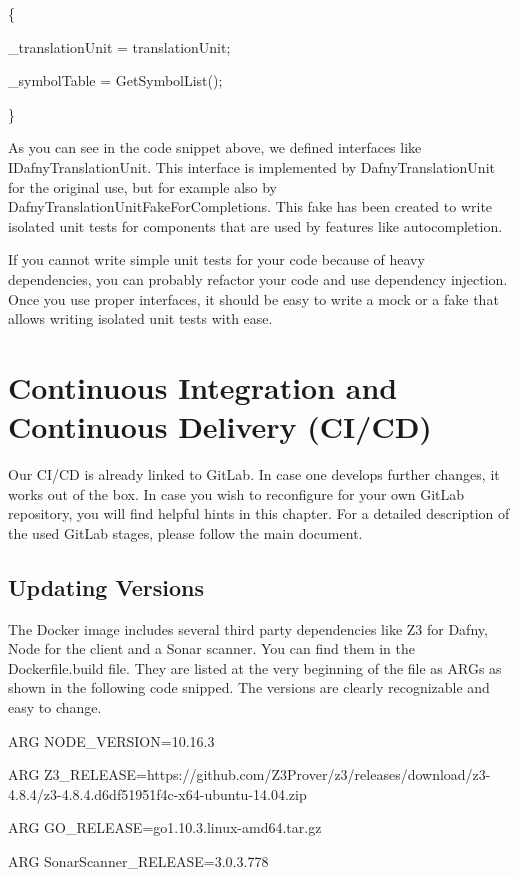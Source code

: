 \documentclass[]{book}
\begin{document}
\{

\_translationUnit = translationUnit;

\_symbolTable = GetSymbolList();

\}

As you can see in the code snippet above, we defined interfaces like IDafnyTranslationUnit. This interface is implemented by DafnyTranslationUnit for the original use, but for example also by DafnyTranslationUnitFakeForCompletions. This fake has been created to write isolated unit tests for components that are used by features like autocompletion.

If you cannot write simple unit tests for your code because of heavy dependencies, you can probably refactor your code and use dependency injection. Once you use proper interfaces, it should be easy to write a mock or a fake that allows writing isolated unit tests with ease.

\chapter{Continuous Integration and Continuous Delivery (CI/CD)}\label{continuous-integration-and-continuous-delivery-cicd}

Our CI/CD is already linked to GitLab. In case one develops further changes, it works out of the box. In case you wish to reconfigure for your own GitLab repository, you will find helpful hints in this chapter. For a detailed description of the used GitLab stages, please follow the main document.

\section{Updating Versions}\label{updating-versions}

The Docker image includes several third party dependencies like Z3 for Dafny, Node for the client and a Sonar scanner. You can find them in the Dockerfile.build file. They are listed at the very beginning of the file as ARGs as shown in the following code snipped. The versions are clearly recognizable and easy to change.

ARG NODE\_VERSION=10.16.3

ARG Z3\_RELEASE=https://github.com/Z3Prover/z3/releases/download/z3-4.8.4/z3-4.8.4.d6df51951f4c-x64-ubuntu-14.04.zip

ARG GO\_RELEASE=go1.10.3.linux-amd64.tar.gz

ARG SonarScanner\_RELEASE=3.0.3.778
\end{document}
